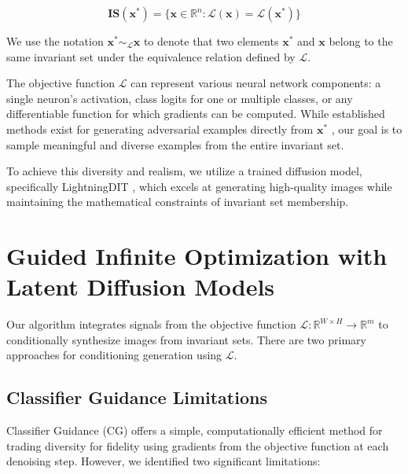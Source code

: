 \documentclass[licencjacka,en]{pracamgr}
\begin{document}
\begin{equation}
  \mathbf{IS}(\mathbf{x^*}) = \{ \mathbf{x} \in \mathbb{R}^n : \mathcal{L}(\mathbf{x}) = \mathcal{L}(\mathbf{x^*}) \}
  \label{eq:is}
\end{equation}

We use the notation $\mathbf{x^*} \sim_{\mathcal{L}} \mathbf{x}$ to denote that two elements $\mathbf{x^*}$ and $\mathbf{x}$ belong to the same invariant set under the equivalence relation defined by $\mathcal{L}$.

The objective function $\mathcal{L}$ can represent various neural network components: a single neuron's activation, class logits for one or multiple classes, or any differentiable function for which gradients can be computed. While established methods exist for generating adversarial examples directly from $\mathbf{x^*}$ \cite{szegedy2014intriguingpropertiesneuralnetworks}, our goal is to sample meaningful and diverse examples from the entire invariant set.

To achieve this diversity and realism, we utilize a trained diffusion model, specifically LightningDIT \cite{yao2025vavae} \cite{yao2024fasterdit}, which excels at generating high-quality images while maintaining the mathematical constraints of invariant set membership.

\section{Guided Infinite Optimization with Latent Diffusion Models}

Our algorithm integrates signals from the objective function $\mathcal{L}:\mathbb{R}^{W \times H} \rightarrow \mathbb{R}^m$ to conditionally synthesize images from invariant sets. There are two primary approaches for conditioning generation using $\mathcal{L}$.

\subsection{Classifier Guidance Limitations}

Classifier Guidance (CG) \cite{dhariwal2021diffusionmodelsbeatgans} offers a simple, computationally efficient method for trading diversity for fidelity using gradients from the objective function at each denoising step. However, we identified two significant limitations:
\end{document}
